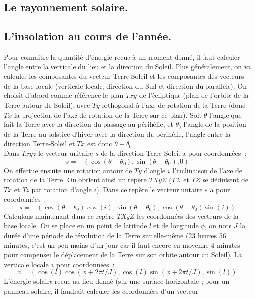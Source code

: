 \documentclass[a4paper,11pt]{book}
\begin{document}
\begin{giacjshere}
\chapter{Le rayonnement solaire.} \label{sec:soleil}

\section{L'insolation au cours de l'ann\'ee.} 
Pour connaitre la quantit\'e d'\'energie recue \`a un moment
donn\'e, il faut calculer l'angle entre la verticale du lieu
et la direction du Soleil. Plus g\'en\'eralement, on va calculer
les composantes du vecteur Terre-Soleil et les composantes
des vecteurs de la base locale (verticale locale, direction du Sud et
direction du parall\`ele). On choisit d'abord comme r\'ef\'erence
le plan $Txy$ de l'\'ecliptique (plan de l'orbite de la Terre
autour du Soleil), avec $Ty$ orthogonal \`a l'axe de rotation 
de la Terre (donc $Tx$ la projection de l'axe de rotation
de la Terre sur ce plan). Soit $\theta$ l'angle que fait la Terre
avec la direction du passage au p\'erih\'elie, et $\theta_0$
l'angle de la position de la Terre au solstice d'hiver avec la
direction du p\'erih\'elie, l'angle entre la direction Terre-Soleil
et $Tx$ est donc $\theta-\theta_0$\\
Dans $Txyz$ le vecteur unitaire $s$
de la direction Terre-Soleil a pour coordonn\'ees~:
\[ s=-(\cos(\theta-\theta_0),\sin(\theta-\theta_0),0)\]
On effectue ensuite une rotation autour
de $Ty$ d'angle $i$ l'inclinaison de l'axe de rotation de la Terre.
On obtient ainsi un rep\`ere $TXyZ$ ($TX$ et $TZ$ se déduisent de 
$Tx$ et $Tz$ par rotation d'angle $i$). Dans ce repère 
le vecteur untaire $s$ a pour coordonnées~:
\[ s=-(\cos(\theta-\theta_0)\cos(i),\sin(\theta-\theta_0),
\cos(\theta-\theta_0)\sin(i)) \]
Calculons maintenant dans ce rep\`ere $TXyZ$ les coordonn\'ees
des vecteurs de la base locale. On se place en un point de latitude
$l$ et de longitude $\phi$, on note $J$ la dur\'ee d'une p\'eriode
de r\'evolution de la Terre sur elle-m\^eme (23 heures 56 minutes,
c'est un peu moins d'un jour car il faut encore en moyenne 4 minutes
pour compenser le d\'eplacement de la Terre sur son orbite autour
du Soleil). La verticale locale a pour coordonn\'ees~:
\[ v=(\cos(l)\cos(\phi+2\pi t/J),\cos(l)\sin(\phi+2\pi t/J),\sin(l))
\]
L'\'energie solaire recue au lieu donn\'e (sur une surface horizontale ;
pour un panneau solaire, il faudrait calculer les coordonn\'ees d'un vecteur

\end{giacjshere}
\end{document}
